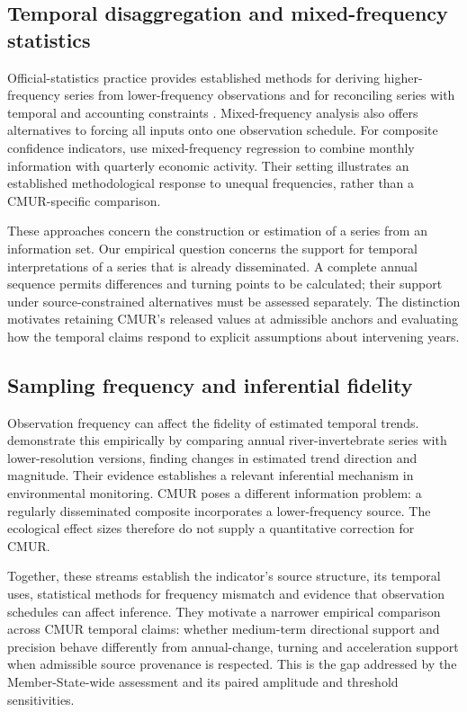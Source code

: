 \subsection{Temporal disaggregation and mixed-frequency statistics}

Official-statistics practice provides established methods for deriving higher-frequency series from lower-frequency observations and for reconciling series with temporal and accounting constraints \parencite{ESS2018,Quilis2018}. Mixed-frequency analysis also offers alternatives to forcing all inputs onto one observation schedule. For composite confidence indicators, \textcite{Mattera2023} use mixed-frequency regression to combine monthly information with quarterly economic activity. Their setting illustrates an established methodological response to unequal frequencies, rather than a CMUR-specific comparison.

These approaches concern the construction or estimation of a series from an information set. Our empirical question concerns the support for temporal interpretations of a series that is already disseminated. A complete annual sequence permits differences and turning points to be calculated; their support under source-constrained alternatives must be assessed separately. The distinction motivates retaining CMUR's released values at admissible anchors and evaluating how the temporal claims respond to explicit assumptions about intervening years.

\subsection{Sampling frequency and inferential fidelity}

Observation frequency can affect the fidelity of estimated temporal trends. \textcite{CortesGuzman2026} demonstrate this empirically by comparing annual river-invertebrate series with lower-resolution versions, finding changes in estimated trend direction and magnitude. Their evidence establishes a relevant inferential mechanism in environmental monitoring. CMUR poses a different information problem: a regularly disseminated composite incorporates a lower-frequency source. The ecological effect sizes therefore do not supply a quantitative correction for CMUR.

Together, these streams establish the indicator's source structure, its temporal uses, statistical methods for frequency mismatch and evidence that observation schedules can affect inference. They motivate a narrower empirical comparison across CMUR temporal claims: whether medium-term directional support and precision behave differently from annual-change, turning and acceleration support when admissible source provenance is respected. This is the gap addressed by the Member-State-wide assessment and its paired amplitude and threshold sensitivities.
